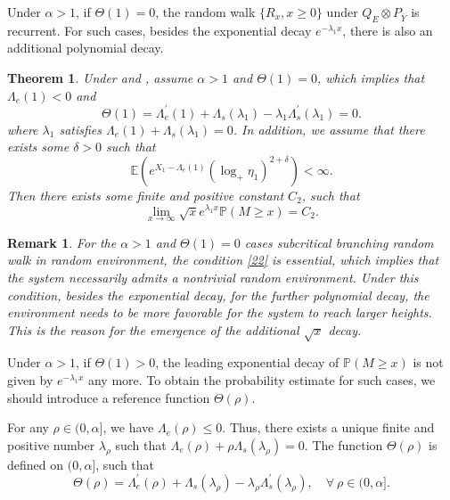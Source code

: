 \documentclass[]{article}
\numberwithin{equation}{section}
\theoremstyle{thmstyleone}%
\newtheorem{theorem}{Theorem}%
\theoremstyle{thmstyletwo}%
\newtheorem{remark}{Remark}%
\theoremstyle{thmstylethree}%
\theoremstyle{thmstylefour}%
\theoremstyle{thmstylefive}%
\theoremstyle{thmstylesix}%
\newcommand{\E}{\mathbb{E}}
\renewcommand{\P}{\mathbb{P}}
\begin{document}
	Under $\alpha>1$, if $\varTheta(1)=0$, the random walk $\{R_x,x\geqslant 0\}$ under $Q_E\otimes P_{\overline{Y}}$ is recurrent. For such cases, besides the exponential decay $e^{-\lambda_1 x}$, there is also an additional polynomial decay.
	\begin{theorem}\label{Theorem of intermediately cases}
		Under  and , assume $\alpha>1$ and
		$\varTheta(1)=0$, which implies that $\Lambda_e(1)<0$ and 
		\begin{equation}\label{22}
			\varTheta(1)=\Lambda_e^\prime(1)+\Lambda_s(\lambda_1)-\lambda_1\Lambda_s^\prime(\lambda_1) =0.
		\end{equation}
		where $\lambda_1$ satisfies $ \Lambda_e(1)+\Lambda_s(\lambda_1) =0 $.
		In addition, we assume that there exists some $\delta>0$ such that
		\begin{equation}\label{additional assumption for intermediately}
			\E\left(e^{X_1-\Lambda_e(1)} (\log_+ \eta_1)^{2+\delta}\right)<\infty.
		\end{equation}
		Then there exists some finite and positive constant $C_2$, such that
		\begin{equation}
			\lim\limits_{x\rightarrow\infty}\sqrt{x}e^{\lambda_1 x }\P(M\geqslant x ) = C_2.
		\end{equation}
	\end{theorem}
	
	
	\begin{remark}
		For the $\alpha>1$ and $\varTheta(1)=0$ cases subcritical branching random walk in random environment, the condition \cref{22} is essential, which implies that the system necessarily admits a nontrivial random environment. Under this condition, besides the exponential decay, for the further polynomial decay, the environment needs to be more favorable for the system to reach larger heights. This is the reason for the emergence of the additional $\sqrt{x}$ decay.
	\end{remark}
	
	Under $\alpha>1$, if $\varTheta(1)>0$, the leading exponential decay of $\P(M\geqslant x)$ is not given by $e^{-\lambda_1 x}$ any more.
	To obtain the probability estimate for such cases, we should introduce a reference function $\varTheta(\rho)$.
	
	For any $\rho\in (0,\alpha]$, we have $\Lambda_e(\rho)\leqslant 0$. Thus, there exists a unique finite and positive number $\lambda_\rho$ such that $\Lambda_e(\rho)+ \rho \Lambda_s(\lambda_\rho)=0$.
	The function $\varTheta(\rho)$ is defined on $(0,\alpha]$, such that
	\begin{equation}
		\varTheta(\rho)
		= \Lambda_e^\prime(\rho) + \Lambda_s(\lambda_\rho) -\lambda_\rho \Lambda_s^\prime(\lambda_\rho), \quad \forall ~ \rho \in (0,\alpha].
	\end{equation}
	
\end{document}
